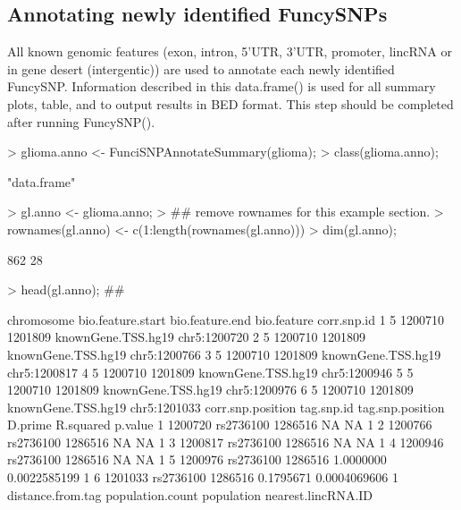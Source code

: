 \documentclass[a4paper]{article}
\begin{document}
\subsection*{Annotating newly identified FuncySNPs}
All known genomic features (exon, intron, 5'UTR, 3'UTR, promoter, lincRNA or in 
gene desert (intergentic)) are used to annotate each newly identified FuncySNP.
 Information described in this data.frame() is used for all summary plots, table, 
 and to output results in BED format. This step should be completed after 
 running FuncySNP().
\begin{Schunk}
\begin{Sinput}
> glioma.anno <- FunciSNPAnnotateSummary(glioma);
> class(glioma.anno);
\end{Sinput}
\begin{Soutput}
[1] "data.frame"
\end{Soutput}
\begin{Sinput}
> gl.anno <- glioma.anno;
> ## remove rownames for this example section.
> rownames(gl.anno) <- c(1:length(rownames(gl.anno)))
> dim(gl.anno);
\end{Sinput}
\begin{Soutput}
[1] 862  28
\end{Soutput}
\begin{Sinput}
> head(gl.anno); ## 
\end{Sinput}
\begin{Soutput}
  chromosome bio.feature.start bio.feature.end        bio.feature  corr.snp.id
1          5           1200710         1201809 knownGene.TSS.hg19 chr5:1200720
2          5           1200710         1201809 knownGene.TSS.hg19 chr5:1200766
3          5           1200710         1201809 knownGene.TSS.hg19 chr5:1200817
4          5           1200710         1201809 knownGene.TSS.hg19 chr5:1200946
5          5           1200710         1201809 knownGene.TSS.hg19 chr5:1200976
6          5           1200710         1201809 knownGene.TSS.hg19 chr5:1201033
  corr.snp.position tag.snp.id tag.snp.position   D.prime    R.squared p.value
1           1200720  rs2736100          1286516        NA           NA       1
2           1200766  rs2736100          1286516        NA           NA       1
3           1200817  rs2736100          1286516        NA           NA       1
4           1200946  rs2736100          1286516        NA           NA       1
5           1200976  rs2736100          1286516 1.0000000 0.0022585199       1
6           1201033  rs2736100          1286516 0.1795671 0.0004069606       1
  distance.from.tag population.count population nearest.lincRNA.ID

\end{Soutput}
\end{Schunk}
\end{document}
